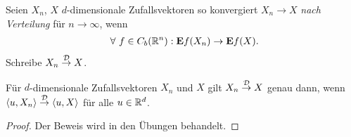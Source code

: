 \begin{defn}
\label{defn:9.2}
Seien $X_n$, $X$ $d$-dimensionale Zufallsvektoren so konvergiert $X_n\to X$
\emph{nach Verteilung} für $n\to\infty$, wenn
\begin{align*}
\forall f\in C_b(\R^n) : \E f(X_n)\to \E f(X).
\end{align*}
Schreibe $X_n\overset{\mathcal{D}}{\to} X$.\fishhere
\end{defn}

\begin{prop}
\label{prop:9.14}
Für $d$-dimensionale Zufallsvektoren $X_n$ und $X$ gilt $X_n \overset{\mathcal{D}}{\to} X$ genau
dann, wenn $\left\langle u,X_n\right\rangle \overset{\mathcal{D}}{\to} \left\langle u,X\right\rangle$
für alle $u\in\mathbb{R}^d$.\fishhere
\end{prop}
\begin{proof}
Der Beweis wird in den Übungen behandelt.\qedhere
\end{proof}

